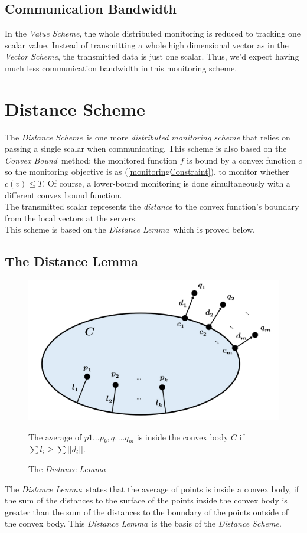 \documentclass[10pt, conference]{IEEEtran}
\newcommand{\vectorScheme}{\textit{Vector Scheme}}
\newcommand{\valueScheme}{\textit{Value Scheme}}
\newcommand{\distanceScheme}{\textit{Distance Scheme}}
\newcommand{\distanceLemma}{\textit{Distance Lemma}}
\newcommand{\convexBound}{\textit{Convex Bound}}
\begin{document}
\subsection{Communication Bandwidth}
In the \valueScheme , the whole distributed monitoring is reduced to tracking one scalar value. Instead of transmitting a whole high dimensional vector as in the \vectorScheme , the transmitted data is just one scalar. Thus, we'd expect having much less communication bandwidth in this monitoring scheme.

\section{Distance Scheme}
The \distanceScheme \ is one more \textit{distributed monitoring scheme} that relies on passing a single scalar when communicating. This scheme is also based on the \convexBound \ method: the monitored function $f$ is bound by a convex function $c$ so the monitoring objective is as (\ref{monitoringConstraint}), to monitor whether ${c(v) \leq T}$. Of course, a lower-bound monitoring is done simultaneously with a different convex bound function. \\
The transmitted scalar represents the \textit{distance} to the convex function's boundary from the local vectors at the servers. \\
This scheme is based on the \distanceLemma \ which is proved below.
\subsection{The Distance Lemma}
\begin{figure}[b]
\begin{center}
\includegraphics[width=0.9\linewidth]{Pics/PNGs/DistanceLemma.png}
\end{center}
{\centering
\caption{The \distanceLemma}}
\medskip
\small
The average of ${p1...p_k, q_1...q_m}$ is inside the convex body $C$ if ${\sum l_i \geq \sum ||d_i||}$.
\end{figure}
The \distanceLemma \ states that the average of points is inside a convex body, if the sum of the distances to the surface of the points inside the convex body is greater than the sum of the distances to the boundary of the points outside of the convex body. This \distanceLemma \ is the basis of the \distanceScheme . \\
\end{document}
